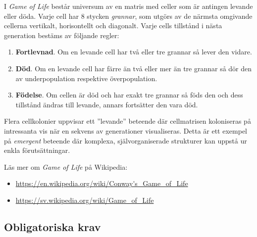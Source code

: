 I \emph{Game of Life} består universum av en matris med celler som är antingen levande eller döda. Varje cell har 8 stycken \emph{grannar}, som utgörs av de närmsta omgivande cellerna vertikalt, horisontellt och diagonalt. Varje cells tillstånd i nästa generation bestäms av följande regler:
\begin{enumerate}[nolistsep]
    \item \textbf{Fortlevnad}. Om en levande cell har två eller tre grannar så lever den vidare.
    \item \textbf{Död}. Om en levande cell har färre än två eller mer än tre grannar så dör den av underpopulation respektive överpopulation.
    \item \textbf{Födelse}. Om cellen är död och har exakt tre grannar så föds den och dess tillstånd ändras till levande, annars fortsätter den vara död.
\end{enumerate}

Flera cellkolonier uppvisar ett ''levande'' beteende där cellmatrisen koloniseras på intressanta vis när en sekvens av generationer visualiseras. Detta är ett exempel på \emph{emergent} beteende där komplexa, självorganiserade strukturer kan uppstå ur enkla förutsättningar.

Läs mer om \emph{Game of Life} på Wikipedia:
\begin{itemize}[noitemsep,topsep=0pt]
    	\item \url{https://en.wikipedia.org/wiki/Conway's_Game_of_Life}
    	\item \url{https://sv.wikipedia.org/wiki/Game_of_Life}
\end{itemize}


\subsection{Obligatoriska krav}

